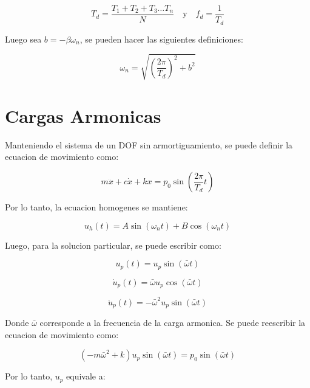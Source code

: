 \documentclass{article}  %
\begin{document}
\begin{equation}
    T_d = \frac{T_1 + T_2 + T_3 \dots T_n}{N} \quad \text{y} \quad f_d = \frac{1}{T_d}
\end{equation}

Luego sea $b = -\beta \omega_n$, se pueden hacer las siguientes definiciones:

\begin{equation}
    \omega_n = \sqrt{(\frac{2 \pi}{T_d})^2 + b^2 } 
\end{equation}

\section{Cargas Armonicas}

Manteniendo el sistema de un DOF sin armortiguamiento, se puede definir la ecuacion de movimiento como:

\begin{equation}
    m \ddot{x} + c \dot{x} + kx = p_0 \sin(\frac{2\pi}{T_d}t)
\end{equation}

Por lo tanto, la ecuacion homogenes se mantiene:

\begin{equation}
    u_h(t) = A \sin(\omega_n t) + B \cos(\omega_n t)
\end{equation}

Luego, para la solucion particular, se puede escribir como:

\begin{equation}
    u_p(t) = u_p \sin(\bar{\omega} t )
\end{equation}

\begin{equation}
    \dot{u}_p(t) = \bar{\omega} u_p \cos(\bar{\omega} t )
\end{equation}

\begin{equation}
    \ddot{u}_p(t) = -\bar{\omega}^2 u_p \sin(\bar{\omega} t )
\end{equation}

Donde $\bar{\omega}$ corresponde a la frecuencia de la carga armonica. Se puede reescribir la ecuacion de movimiento como:

\begin{equation}
    (-m \bar{\omega}^2 + k)u_p \sin(\bar{\omega} t ) = p_0 \sin(\bar{\omega} t )
\end{equation}

Por lo tanto, $u_p$ equivale a:
\end{document}
